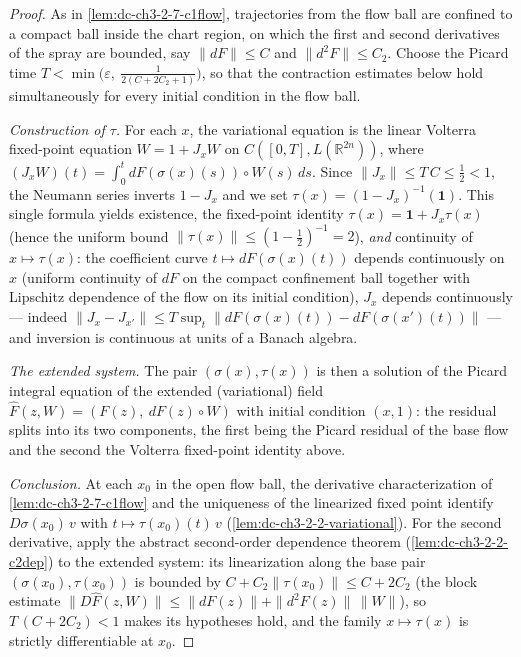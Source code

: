 \begin{proof}
  \sketch
  \leanok
  As in \cref{lem:dc-ch3-2-7-c1flow}, trajectories from the flow ball are
  confined to a compact ball inside the chart region, on which the first and
  second derivatives of the spray are bounded, say $\|dF\| \le C$ and
  $\|d^2F\| \le C_2$. Choose the Picard time
  $T < \min\big(\varepsilon,\ \tfrac{1}{2(C + 2C_2 + 1)}\big)$, so that the
  contraction estimates below hold simultaneously for every initial condition
  in the flow ball.

  \emph{Construction of $\tau$.} For each $x$, the variational equation is
  the linear Volterra fixed-point equation $W = 1 + J_x W$ on $C([0,T],
  L(\mathbb{R}^{2n}))$, where $(J_x W)(t) = \int_0^t dF(\sigma(x)(s)) \circ
  W(s)\, ds$. Since $\|J_x\| \le T\,C \le \tfrac12 < 1$, the Neumann series
  inverts $1 - J_x$ and we set $\tau(x) = (1 - J_x)^{-1}(\mathbf{1})$. This
  single formula yields existence, the fixed-point identity
  $\tau(x) = \mathbf{1} + J_x \tau(x)$ (hence the uniform bound
  $\|\tau(x)\| \le (1 - \tfrac12)^{-1} = 2$), \emph{and} continuity of
  $x \mapsto \tau(x)$: the coefficient curve $t \mapsto dF(\sigma(x)(t))$
  depends continuously on $x$ (uniform continuity of $dF$ on the compact
  confinement ball together with Lipschitz dependence of the flow on its
  initial condition), $J_x$ depends continuously — indeed
  $\|J_x - J_{x'}\| \le T \sup_t \|dF(\sigma(x)(t)) - dF(\sigma(x')(t))\|$ —
  and inversion is continuous at units of a Banach algebra.

  \emph{The extended system.} The pair $(\sigma(x), \tau(x))$ is then a
  solution of the Picard integral equation of the extended (variational)
  field $\hat F(z, W) = (F(z),\ dF(z) \circ W)$ with initial condition
  $(x, 1)$: the residual splits into its two components, the first being the
  Picard residual of the base flow and the second the Volterra fixed-point
  identity above.

  \emph{Conclusion.} At each $x_0$ in the open flow ball, the derivative
  characterization of \cref{lem:dc-ch3-2-7-c1flow} and the uniqueness of the
  linearized fixed point identify $D\sigma(x_0)\,v$ with
  $t \mapsto \tau(x_0)(t)\,v$ (\cref{lem:dc-ch3-2-2-variational}). For the
  second derivative, apply the abstract second-order dependence theorem
  (\cref{lem:dc-ch3-2-2-c2dep}) to the extended system: its linearization
  along the base pair $(\sigma(x_0), \tau(x_0))$ is bounded by
  $C + C_2 \|\tau(x_0)\| \le C + 2C_2$ (the block estimate
  $\|D\hat F(z, W)\| \le \|dF(z)\| + \|d^2F(z)\|\,\|W\|$), so
  $T\,(C + 2C_2) < 1$ makes its hypotheses hold, and the family
  $x \mapsto \tau(x)$ is strictly differentiable at $x_0$.
\end{proof}

